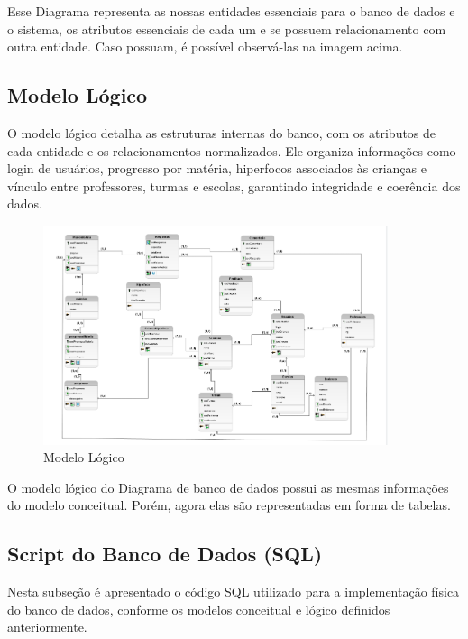 \documentclass[
  a4paper,
  12pt,
  english,
  brazilian,
]{article}
\begin{document}
Esse Diagrama representa as nossas entidades essenciais para o banco de dados e o sistema, os atributos essenciais de cada um e se possuem relacionamento com outra entidade. Caso possuam, é possível observá-las na imagem acima.

\subsection*{Modelo Lógico}

O modelo lógico detalha as estruturas internas do banco, com os atributos de cada entidade e os relacionamentos normalizados. Ele organiza informações como login de usuários, progresso por matéria, hiperfocos associados às crianças e vínculo entre professores, turmas e escolas, garantindo integridade e coerência dos dados.

\begin{figure}[H]
\centering
\caption{Modelo Lógico}%
\label{fig:modelo-logico}
\includegraphics[width=0.9\textwidth]{Logos/modelo_logico.png}
\end{figure}

O modelo lógico do Diagrama de banco de dados possui as mesmas informações do modelo conceitual. Porém, agora elas são representadas em forma de tabelas.

\subsection*{Script do Banco de Dados (SQL)}

Nesta subseção é apresentado o código SQL utilizado para a implementação física do banco de dados, conforme os modelos conceitual e lógico definidos anteriormente.
\end{document}

